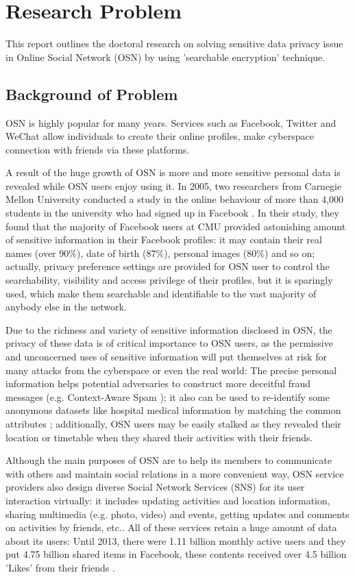 \chapter{Research Problem}
This report outlines the doctoral research on solving sensitive data privacy issue in Online Social Network (OSN) by using 'searchable encryption' technique. 

\section{Background of Problem}
OSN is highly popular for many years. Services such as Facebook, Twitter and WeChat allow individuals to create their online profiles, make cyberspace connection with friends via these platforms. 

A result of the huge growth of OSN is more and more sensitive personal data is revealed while OSN users enjoy using it. In 2005, two researchers from Carnegie Mellon University conducted a study in the online behaviour of more than 4,000 students in the university who had signed up in Facebook \cite{gross2005information}. In their study, they found that the majority of Facebook users at CMU provided astonishing amount of sensitive information in their Facebook profiles: it may contain their real names (over $90\%$), date of birth ($87\%$), personal images ($80\%$) and so on; actually, privacy preference settings are provided for OSN user to control the searchability, visibility and access privilege of their profiles, but it is sparingly used, which make them searchable and identifiable to the vast majority of anybody else in the network. 

Due to the richness and variety of sensitive information disclosed in OSN, the privacy of these data is of critical importance to OSN users, as the permissive and unconcerned uses of sensitive information will put themselves at risk for many attacks from the cyberspace or even the real world: The precise personal information helps potential adversaries to construct more deceitful fraud messages (e.g. Context-Aware Spam \cite{brown2008social}); it also can be used to re-identify some anonymous datasets like hospital medical information by matching the common attributes \cite{sweeney2002k}; additionally, OSN users may be easily stalked as they revealed their location or timetable when they shared their activities with their friends.

Although the main purposes of OSN are to help its members to communicate with others and maintain social relations in a more convenient way, OSN service providers also design diverse Social Network Services (SNS) for its user interaction virtually: it includes updating activities and location information, sharing multimedia (e.g. photo, video) and events, getting updates and comments on activities by friends, etc.. All of these services retain a huge amount of data about its users: Until 2013, there were 1.11 billion monthly active users and they put 4.75 billion shared items in Facebook, these contents received over 4.5 billion 'Likes' from their friends \cite{facebook2013growth}. 

